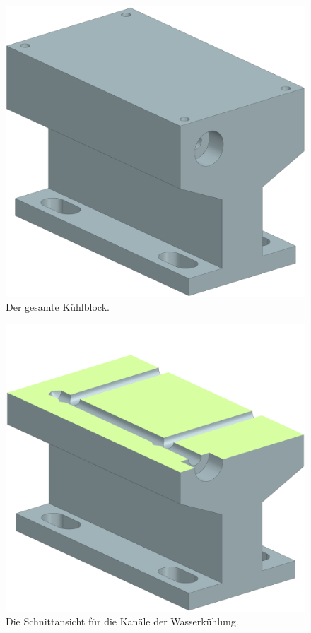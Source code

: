 \begin{appendix}
{{\begin{figure}[H]
    \centering
    \includegraphics[scale=0.35]{98_images/kuehlblock_isometrie.PNG}
    \caption{Der gesamte Kühlblock.}
    \label{fig:enter-label}
\end{figure}

\begin{figure}[H]
    \centering
    \includegraphics[scale=0.35]{98_images/kuehlblock_section.PNG}
    \caption{Die Schnittansicht für die Kanäle der Wasserkühlung.}
    \label{fig:enter-label}
\end{figure}

}}
\end{appendix}
